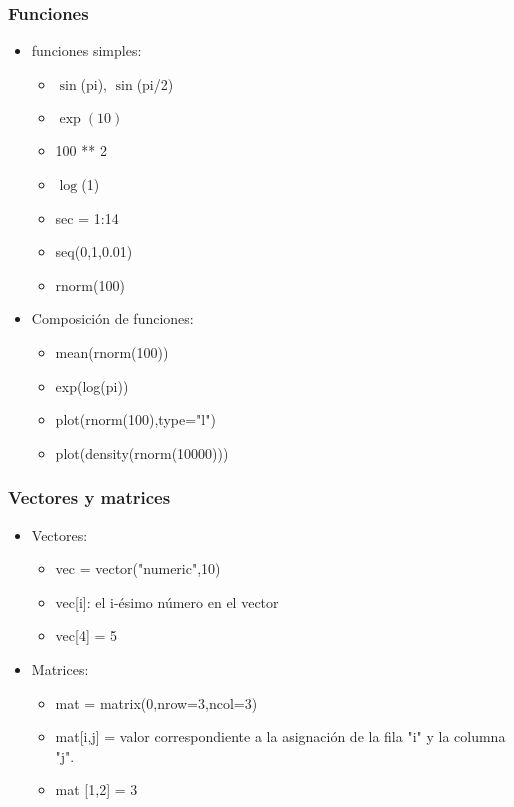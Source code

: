 \documentclass[11pt]{beamer}
\begin{document}
\begin{frame}
\frametitle{Funciones}
\begin{itemize}
	\item funciones simples: 
	\begin{itemize}
		\item $\sin$(pi), $\sin$(pi/2)
		\item $\exp(10)$ 
		\item 100 ** 2 
		\item $\log$(1)
		\item sec = 1:14
		\item seq(0,1,0.01)
		\item rnorm(100)
	\end{itemize}
	\item Composición de funciones: 
	\begin{itemize}
		\item mean(rnorm(100))
		\item exp(log(pi))
		\item plot(rnorm(100),type="l")
		\item plot(density(rnorm(10000)))
	\end{itemize}
\end{itemize}
\end{frame}

\begin{frame}
\frametitle{Vectores y matrices}
\begin{itemize}
	\item Vectores: 
	\begin{itemize}
		\item vec = vector("numeric",10)
		\item vec[i]: el i-ésimo número en el vector
		\item vec[4] = 5
	\end{itemize}
	\item Matrices:
	\begin{itemize}
		\item mat = matrix(0,nrow=3,ncol=3)
		\item mat[i,j] = valor correspondiente a la asignación de la fila "i" y la columna "j".
		\item mat [1,2] = 3
	\end{itemize}
\end{itemize}
\end{frame}
\end{document}
